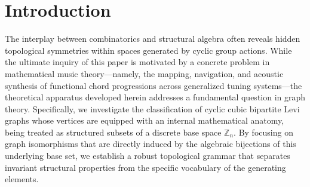 \documentclass[11pt,letterpaper]{amsart}
\begin{document}




\section{Introduction}
\label{sec:intro}

The interplay between combinatorics and structural algebra often reveals hidden topological symmetries within spaces generated by cyclic group actions. While the ultimate inquiry of this paper is motivated by a concrete problem in mathematical music theory—namely, the mapping, navigation, and acoustic synthesis of functional chord progressions across generalized tuning systems—the theoretical apparatus developed herein addresses a fundamental question in graph theory. Specifically, we investigate the classification of cyclic cubic bipartite Levi graphs whose vertices are equipped with an internal mathematical anatomy, being treated as structured subsets of a discrete base space $\mathbb{Z}_n$. By focusing on graph isomorphisms that are directly induced by the algebraic bijections of this underlying base set, we establish a robust topological grammar that separates invariant structural properties from the specific vocabulary of the generating elements.
\end{document}
